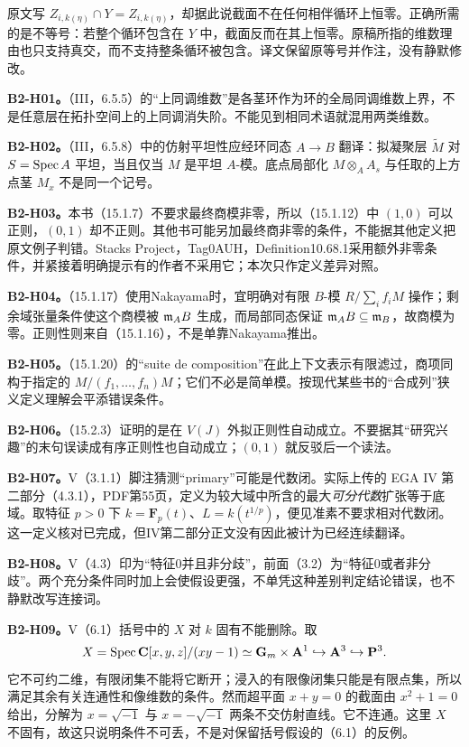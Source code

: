 原文写 $Z_{i,k(\eta)}\cap Y=Z_{i,k(\eta)}$，却据此说截面不在任何相伴循环上恒零。正确所需的是不等号：若整个循环包含在 $Y$ 中，截面反而在其上恒零。原稿所指的维数理由也只支持真交，而不支持整条循环被包含。译文保留原等号并作注，没有静默修改。

\textbf{B2-H01。}（III，6.5.5）的“上同调维数”是各茎环作为环的全局同调维数上界，不是任意层在拓扑空间上的上同调消失阶。不能见到相同术语就混用两类维数。

\textbf{B2-H02。}（III，6.5.8）中的仿射平坦性应经环同态 $A\to B$ 翻译：拟凝聚层 $\widetilde M$ 对 $S=\operatorname{Spec} A$ 平坦，当且仅当 $M$ 是平坦 $A$-模。底点局部化 $M\otimes_AA_s$ 与任取的上方点茎 $M_x$ 不是同一个记号。

\textbf{B2-H03。}本书（15.1.7）不要求最终商模非零，所以（15.1.12）中 $(1,0)$ 可以正则，$(0,1)$ 却不正则。其他书可能另加最终商非零的条件，不能据其他定义把原文例子判错。Stacks Project，Tag0AUH，Definition10.68.1采用额外非零条件，并紧接着明确提示有的作者不采用它；本次只作定义差异对照。

\textbf{B2-H04。}（15.1.17）使用Nakayama时，宜明确对有限 $B$-模 $R/\sum_if_iM$ 操作；剩余域张量条件使这个商模被 $\mathfrak m_AB$ 生成，而局部同态保证 $\mathfrak m_AB\subseteq\mathfrak m_B$，故商模为零。正则性则来自（15.1.16），不是单靠Nakayama推出。

\textbf{B2-H05。}（15.1.20）的“suite de composition”在此上下文表示有限滤过，商项同构于指定的 $M/(f_1,\ldots,f_n)M$；它们不必是简单模。按现代某些书的“合成列”狭义定义理解会平添错误条件。

\textbf{B2-H06。}（15.2.3）证明的是在 $V(J)$ 外拟正则性自动成立。不要据其“研究兴趣”的末句误读成有序正则性也自动成立；$(0,1)$ 就反驳后一个读法。

\textbf{B2-H07。}V（3.1.1）脚注猜测“primary”可能是代数闭。实际上传的 EGA IV 第二部分（4.3.1），PDF第55页，定义为较大域中所含的最大\emph{可分代数}扩张等于底域。取特征 $p>0$ 下 $k=\mathbf F_p(t)$、$L=k(t^{1/p})$，便见准素不要求相对代数闭。这一定义核对已完成，但IV第二部分正文没有因此被计为已经连续翻译。

\textbf{B2-H08。}V（4.3）印为“特征0并且非分歧”，前面（3.2）为“特征0或者非分歧”。两个充分条件同时加上会使假设更强，不单凭这种差别判定结论错误，也不静默改写连接词。

\textbf{B2-H09。}V（6.1）括号中的 $X$ 对 $k$ 固有不能删除。取
\[
 X=\operatorname{Spec}\mathbf C[x,y,z]/(xy-1)\simeq\mathbf G_m\times\mathbf A^1
 \hookrightarrow\mathbf A^3\hookrightarrow\mathbf P^3.
\]
它不可约二维，有限闭集不能将它断开；浸入的有限像闭集只能是有限点集，所以满足其余有关连通性和像维数的条件。然而超平面 $x+y=0$ 的截面由
$x^2+1=0$ 给出，分解为 $x=\sqrt{-1}$ 与 $x=-\sqrt{-1}$ 两条不交仿射直线。它不连通。这里 $X$ 不固有，故这只说明条件不可丢，不是对保留括号假设的（6.1）的反例。

